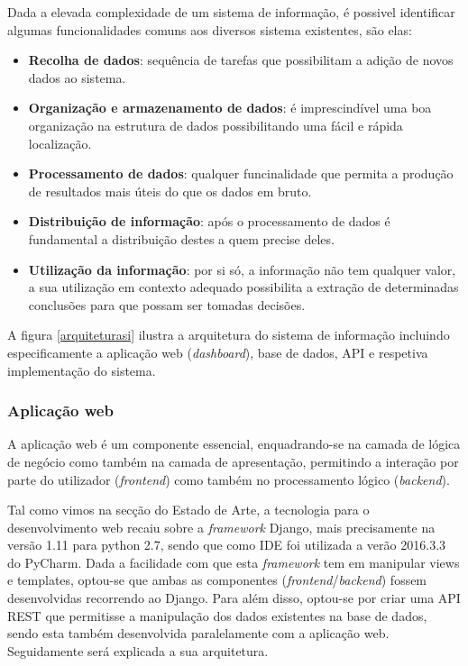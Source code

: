 Dada a elevada complexidade de um sistema de informação, é possivel identificar algumas funcionalidades comuns aos diversos sistema existentes, são elas\cite{Turban1996}: 

\begin{itemize}
	\item \textbf{Recolha de dados}: sequência de tarefas que possibilitam a adição de novos dados ao sistema.
	
	\item \textbf{Organização e armazenamento de dados}: é imprescindível uma boa organização na estrutura de dados possibilitando uma fácil e rápida localização.
	\item \textbf{Processamento de dados}: qualquer funcinalidade que permita a produção de resultados mais úteis do que os dados em bruto. 
	 
	\item \textbf{Distribuição de informação}: após o processamento de dados é fundamental a distribuição destes a quem precise deles.
	
	\item \textbf{Utilização da informação}: por si só, a informação não tem qualquer valor, a sua utilização em contexto adequado possibilita a extração de determinadas conclusões para que possam ser tomadas decisões.
	
\end{itemize}



A figura \ref{arquiteturasi} ilustra a arquitetura do sistema de informação incluindo especificamente a aplicação web (\textit{dashboard}), base de dados, \acs{API}   e respetiva implementação do sistema. 





\subsubsection{Aplicação web}

A aplicação web é um componente essencial, enquadrando-se na camada de lógica de negócio como também na camada de apresentação, permitindo a interação por parte do utilizador (\textit{frontend}) como também no processamento lógico (\textit{backend}).   

Tal como vimos na secção do Estado de Arte, a tecnologia para o desenvolvimento web recaiu sobre a \textit{framework} Django, mais precisamente na versão 1.11 para python 2.7, sendo que como \ac{IDE} foi utilizada a verão 2016.3.3 do PyCharm. Dada a facilidade com que esta \textit{framework} tem em manipular views e templates, optou-se que ambas as componentes (\textit{frontend}/\textit{backend}) fossem desenvolvidas recorrendo ao Django. Para além disso, optou-se por criar uma API REST que permitisse a manipulação dos dados existentes na base de dados, sendo esta também desenvolvida paralelamente com a aplicação web. Seguidamente será explicada a sua arquitetura.   


